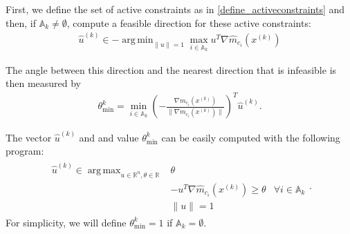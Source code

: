 \documentclass{article}
\theoremstyle{case}
\DeclareMathOperator*{\argmin}{arg\,min}
\DeclareMathOperator*{\argmax}{arg\,max}
\newcommand{\xk}{{x^{(k)}}}
\newcommand{\Rn}{\mathbb R^n}
\newcommand{\reals}{\mathbb R}
\newcommand{\huk}{{{\hat u}^{(k)}}}
\newcommand{\hgik}{{\frac{\nabla m_{c_i}(\xk)}{\|\nabla m_{c_i}(\xk)\|}}}
\newcommand{\hgmcik}{{\nabla \hat m_{c_i}(\xk)}}
\newcommand{\activeconstraintsk}{{\mathbb A_{k}}}
\newcommand{\thetamink}{{\theta^k_{\text{min}}}}
\begin{document}
First, we define the set of active constraints as in \cref{define_activeconstraints}
and then, if $\activeconstraintsk \ne \emptyset$, compute a feasible direction for these active constraints:
\begin{align}
\huk \in -\argmin_{\|u\| = 1} \max_{i \in \activeconstraintsk} u^T\hgmcik\label{define_u}
\end{align}


The angle between this direction and the nearest direction that is infeasible is then measured by
\begin{align}
\thetamink = \min_{i \in \activeconstraintsk} \left(-\hgik\right)^T \huk \label{define_thetamink}.
\end{align}

The vector $\huk$ and and value $\thetamink$ can be easily computed with the following program:
\begin{align*}
\begin{array}{ccc}
\huk \in \argmax_{u\in\Rn, \theta\in\reals} & \theta \\
& -u^T \hgmcik \ge \theta & \forall i \in \activeconstraintsk \\
& \|u \| = 1& 
\end{array}.
\end{align*}
For simplicity, we will define $\thetamink = 1$ if $\activeconstraintsk = \emptyset$.
\end{document}
